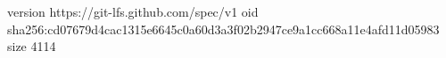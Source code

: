 version https://git-lfs.github.com/spec/v1
oid sha256:cd07679d4cac1315e6645c0a60d3a3f02b2947ce9a1cc668a11e4afd11d05983
size 4114
